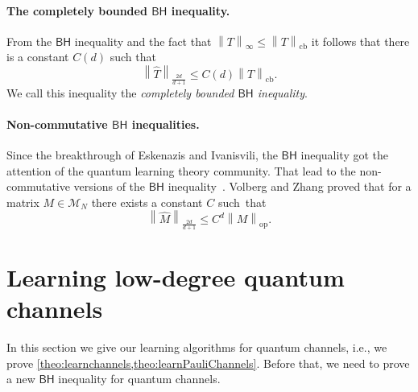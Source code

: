 \documentclass[11pt]{article}
\newcommand{\norm}[1]{\left\|{#1}\right\|}
\newcommand{\BH}{\textsf{BH}}
\theoremstyle{plain}
\DeclareMathOperator{\cb}{cb}
\renewcommand{\cb}{{\mathrm{cb}}}
\DeclareMathOperator{\op}{op}
\theoremstyle{plain}
\theoremstyle{definition}
\theoremstyle{remark}
\theoremstyle{named}
\begin{document}
\paragraph{The completely bounded $\BH$ inequality.} From the $\BH$ inequality and the fact that $\norm{T}_{\infty}\leq \norm{T}_{\cb}$ it follows that there is a constant $C(d)$ such that 
\begin{equation}\label{BHG:forms}
    \norm{\widehat T}_{\frac{2d}{d+1}}\leq C(d)\norm{T}_{\cb}.
\end{equation}
We call this inequality the \emph{completely bounded $\BH$ inequality}. 

\paragraph{Non-commutative $\BH$ inequalities.} Since the breakthrough of Eskenazis and Ivanisvili, the $\BH$ inequality got the attention of the quantum learning theory community. That lead to the non-commutative versions of the $\BH$ inequality~\cite{huang2022learning,volberg2023noncommutative,slote2023bohnenblust,slote2023noncommutative,klein_et_al:LIPIcs.ITCS.2024.69}.  Volberg and Zhang \cite{volberg2023noncommutative} proved that for a matrix $M\in\mathcal{M}_N$ there exists a constant $C$ such~that 
\begin{equation}\label{eq:BHUnitaries}
    \norm{\widehat M}_{\frac{2d}{d+1}}\leq C^{d} \norm{M}_{\op}.
\end{equation}























\section{Learning low-degree quantum channels}
In this section we give our learning algorithms for quantum channels, i.e., we prove \cref{theo:learnchannels,theo:learnPauliChannels}. Before that, we need to prove a new $\BH$ inequality for quantum channels.
\end{document}
